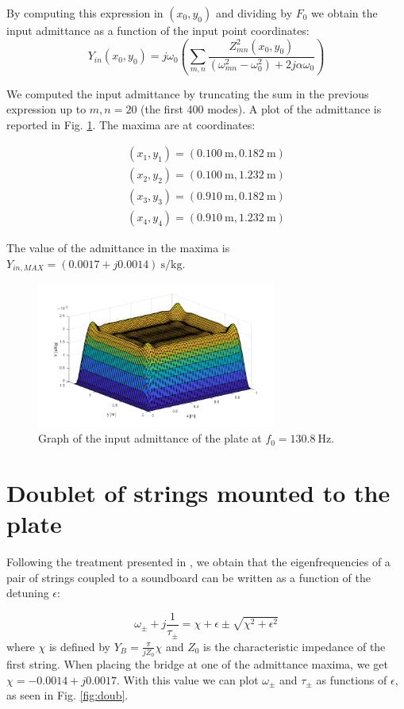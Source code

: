 \documentclass[a4paper]{article}
\begin{document}
By computing this expression in $(x_0, y_0)$ and dividing by $F_0$ we obtain the input admittance as a function of the input point coordinates:
$$ Y_{in}(x_0, y_0) =  j\omega_0 \left( \sum_{m,n} \frac{Z_{mn}^2(x_0, y_0)}{(\omega_{mn}^2 - \omega_0^2) + 2j\alpha \omega_0} \right)$$

We computed the input admittance by truncating the sum in the previous expression up to $m, n = 20$ (the first 400 modes). A plot of the admittance is reported in Fig. \ref{fig:adm}. The maxima are at coordinates:

\begin{align*}
	(x_1, y_1) = (\SI{0.100}{\metre}, \SI{0.182}{\meter}) \\
	(x_2, y_2) = (\SI{0.100}{\metre}, \SI{1.232}{\meter}) \\
	(x_3, y_3) = (\SI{0.910}{\metre}, \SI{0.182}{\meter}) \\
	(x_4, y_4) = (\SI{0.910}{\metre}, \SI{1.232}{\meter})
\end{align*}

The value of the admittance in the maxima is $Y_{in, MAX} = (0.0017 + j0.0014)~\si{\second\per\kilogram}$.

\begin{figure}[h]
	\centering
	\includegraphics[width=0.7\textwidth]{admittance.png}
	\caption{Graph of the input admittance of the plate at $f_0 = \SI{130.8}{\hertz}$.}
	\label{fig:adm}
\end{figure}

\section{Doublet of strings mounted to the plate}

Following the treatment presented in \cite{chker}, we obtain that the eigenfrequencies of a pair of strings coupled to a soundboard can be written as a function of the detuning $\epsilon$:

$$ \omega_{\pm} + j \frac{1}{\tau_{\pm}} = \chi + \epsilon \pm \sqrt{\chi^2 + \epsilon^2}  $$
where $\chi$ is defined by $Y_B = \frac{\pi }{j Z_0}\chi$ and $Z_0$ is the characteristic impedance of the first string. When placing the bridge at one of the admittance maxima, we get $\chi = -0.0014 + j 0.0017$. With this value we can plot $\omega_{\pm}$ and $\tau_{\pm}$ as functions of $\epsilon$, as seen in Fig. \ref{fig:doub}.
\end{document}
